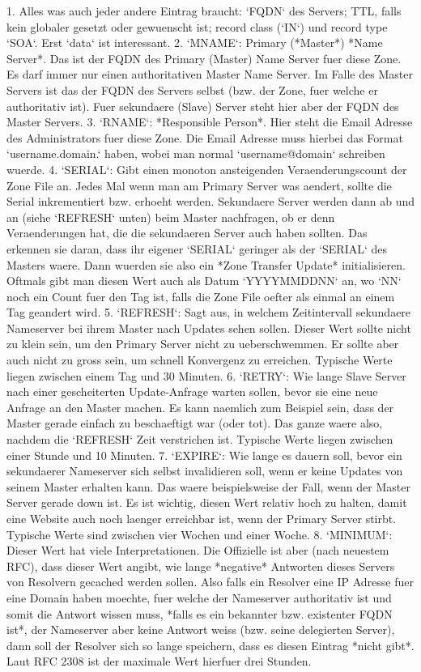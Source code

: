 1. Alles was auch jeder andere Eintrag braucht: `FQDN` des Servers; TTL, falls
   kein globaler gesetzt oder gewuenscht ist; record class (`IN`) und record
   type `SOA`. Erst `data` ist interessant.
2. `MNAME`: Primary (*Master*) *Name Server*. Das ist der FQDN des Primary (Master)
   Name Server fuer diese Zone. Es darf immer nur einen authoritativen Master
   Name Server. Im Falle des Master Servers ist das der FQDN des Servers selbst
   (bzw. der Zone, fuer welche er authoritativ ist). Fuer sekundaere (Slave)
   Server steht hier aber der FQDN des Master Servers.
3. `RNAME`: *Responsible Person*. Hier steht die Email Adresse des
   Administrators fuer diese Zone. Die Email Adresse muss hierbei das Format
   `username.domain.` haben, wobei man normal `username@domain` schreiben
   wuerde.
4. `SERIAL`: Gibt einen monoton ansteigenden Veraenderungscount der Zone File
   an. Jedes Mal wenn man am Primary Server was aendert, sollte die Serial
   inkrementiert bzw. erhoeht werden. Sekundaere Server werden dann ab und an
   (siehe `REFRESH` unten) beim Master nachfragen, ob er denn Veraenderungen
   hat, die die sekundaeren Server auch haben sollten. Das erkennen sie daran,
   dass ihr eigener `SERIAL` geringer als der `SERIAL` des Masters waere. Dann
   wuerden sie also ein *Zone Transfer Update* initialisieren. Oftmals gibt man
   diesen Wert auch als Datum `YYYYMMDDNN` an, wo `NN` noch ein Count fuer den
   Tag ist, falls die Zone File oefter als einmal an einem Tag geandert wird.
5. `REFRESH`: Sagt aus, in welchem Zeitintervall sekundaere Nameserver bei ihrem
   Master nach Updates sehen sollen. Dieser Wert sollte nicht zu klein sein, um
   den Primary Server nicht zu ueberschwemmen. Er sollte aber auch nicht zu
   gross sein, um schnell Konvergenz zu erreichen. Typische Werte liegen
   zwischen einem Tag und 30 Minuten.
6. `RETRY`: Wie lange Slave Server nach einer gescheiterten Update-Anfrage
   warten sollen, bevor sie eine neue Anfrage an den Master machen. Es kann
   naemlich zum Beispiel sein, dass der Master gerade einfach zu beschaeftigt
   war (oder tot). Das ganze waere also, nachdem die `REFRESH` Zeit verstrichen
   ist. Typische Werte liegen zwischen einer Stunde und 10 Minuten.
7. `EXPIRE`: Wie lange es dauern soll, bevor ein sekundaerer Nameserver sich
   selbst invalidieren soll, wenn er keine Updates von seinem Master erhalten
   kann. Das waere beispielsweise der Fall, wenn der Master Server gerade down
   ist. Es ist wichtig, diesen Wert relativ hoch zu halten, damit eine Website
   auch noch laenger erreichbar ist, wenn der Primary Server stirbt. Typische
   Werte sind zwischen vier Wochen und einer Woche.
8. `MINIMUM`: Dieser Wert hat viele Interpretationen. Die Offizielle ist aber
   (nach neuestem RFC), dass dieser Wert angibt, wie lange *negative* Antworten
   dieses Servers von Resolvern gecached werden sollen. Also falls ein Resolver
   eine IP Adresse fuer eine Domain haben moechte, fuer welche der Nameserver
   authoritativ ist und somit die Antwort wissen muss, *falls es ein bekannter
   bzw. existenter FQDN ist*, der Nameserver aber keine Antwort weiss
   (bzw. seine delegierten Server), dann soll der Resolver sich so lange
   speichern, dass es diesen Eintrag *nicht gibt*. Laut RFC 2308 ist der
   maximale Wert hierfuer drei Stunden.

